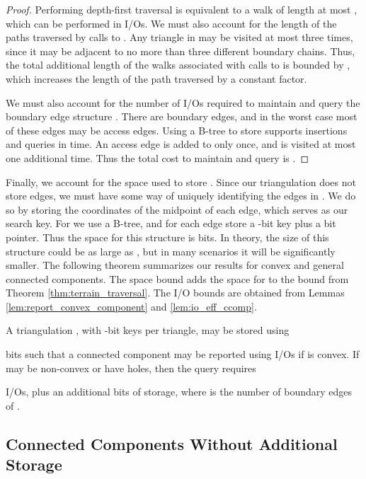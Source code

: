   \begin{proof}
  Performing depth-first traversal is equivalent to a walk of 
  length at most , which can be performed in 
   I/Os. 
  We must also account for the length of the paths traversed by calls 
  to . 
  Any triangle in  may be visited at most three times, since 
  it may be adjacent to no more than three different boundary chains. 
  Thus, the total additional length of the walks associated with calls 
  to  is bounded by , which 
  increases the length of the path traversed by a constant factor. 

  We must also account for the number of I/Os required to maintain 
  and query the boundary edge structure . 
  There are  boundary edges, and in the worst case most of these 
  edges may be access edges. 
  Using a B-tree to store  
  supports insertions and queries in  time.  
  An access edge is added to  only once, and is visited at 
  most one additional time. 
  Thus the total cost to maintain and query  is .  
  \end{proof}

  Finally, we account for the space used to store . 
  Since our triangulation does not store edges, we must have some
  way of uniquely identifying the edges in .
  We do so by storing the coordinates of the midpoint of each edge, which
  serves as our search key.
  For  we use a B-tree, and for each edge store a -bit 
  key plus a  bit pointer. 
  Thus the space for this structure is  
  bits. 
  In theory, the size of this structure could be as large as ,
  but in many scenarios it will be significantly smaller.  
  The following theorem summarizes our results 
  for convex and general connected components. 
  The space bound adds the space for  to the bound from
  Theorem \ref{thm:terrain_traversal}.
  The I/O bounds are obtained from Lemmas \ref{lem:report_convex_component} 
  and \ref{lem:io_eff_ccomp}.

  \begin{theorem}\label{thm:conn_comp}
  A triangulation , with -bit keys per triangle, may be 
  stored using 
   
  bits such that a 
  connected component  may be reported using 
   I/Os if 
  is convex.  
  If  may be non-convex or have holes, then the query requires 
   
  I/Os, plus an additional  bits of storage, 
  where  is the number of boundary edges of 
  .
  \end{theorem}

\subsection{Connected Components Without Additional Storage}
  \label{ssec:no_add_storage}


